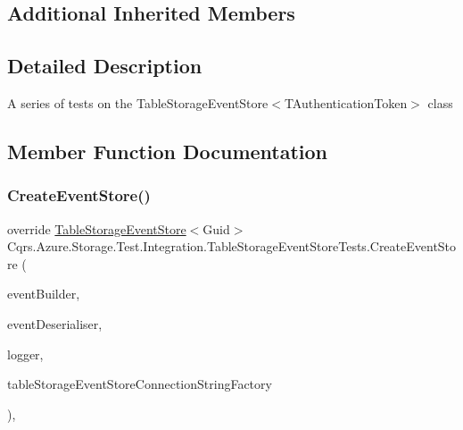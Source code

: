 \subsection*{Additional Inherited Members}


\subsection{Detailed Description}
A series of tests on the Table\+Storage\+Event\+Store$<$\+T\+Authentication\+Token$>$ class 



\subsection{Member Function Documentation}
\mbox{\label{classCqrs_1_1Azure_1_1Storage_1_1Test_1_1Integration_1_1TableStorageEventStoreTests_aa7c476f27ce9940048ac7abde7cfabcb_aa7c476f27ce9940048ac7abde7cfabcb}} 
\subsubsection{\texorpdfstring{Create\+Event\+Store()}{CreateEventStore()}}
{\footnotesize\ttfamily override \hyperlink{classCqrs_1_1Azure_1_1BlobStorage_1_1Events_1_1TableStorageEventStore}{Table\+Storage\+Event\+Store}$<$Guid$>$ Cqrs.\+Azure.\+Storage.\+Test.\+Integration.\+Table\+Storage\+Event\+Store\+Tests.\+Create\+Event\+Store (\begin{DoxyParamCaption}\item[{\hyperlink{interfaceCqrs_1_1Events_1_1IEventBuilder}{I\+Event\+Builder}$<$ Guid $>$}]{event\+Builder,  }\item[{\hyperlink{interfaceCqrs_1_1Events_1_1IEventDeserialiser}{I\+Event\+Deserialiser}$<$ Guid $>$}]{event\+Deserialiser,  }\item[{I\+Logger}]{logger,  }\item[{\hyperlink{interfaceCqrs_1_1Azure_1_1BlobStorage_1_1ITableStorageStoreConnectionStringFactory}{I\+Table\+Storage\+Store\+Connection\+String\+Factory}}]{table\+Storage\+Event\+Store\+Connection\+String\+Factory }\end{DoxyParamCaption})\hspace{0.3cm}{\ttfamily [protected]}, {\ttfamily [virtual]}}



